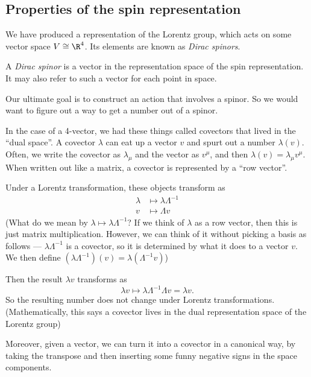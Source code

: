 \documentclass[a4paper]{article}
\begin{document}

\subsection{Properties of the spin representation}
We have produced a representation of the Lorentz group, which acts on some vector space $V \cong \R^4$. Its elements are known as \emph{Dirac spinors}.


\begin{defi}
  A \emph{Dirac spinor} is a vector in the representation space of the spin representation. It may also refer to such a vector for each point in space.
\end{defi}

Our ultimate goal is to construct an action that involves a spinor. So we would want to figure out a way to get a number out of a spinor.

In the case of a 4-vector, we had these things called covectors that lived in the ``dual space''. A covector $\lambda$ can eat up a vector $v$ and spurt out a number $\lambda(v)$. Often, we write the covector as $\lambda_\mu$ and the vector as $v^\mu$, and then $\lambda(v) = \lambda_\mu v^\mu$. When written out like a matrix, a covector is represented by a ``row vector''.

Under a Lorentz transformation, these objects transform as
\begin{align*}
  \lambda &\mapsto \lambda \Lambda^{-1}\\
  v &\mapsto \Lambda v
\end{align*}
(What do we mean by $\lambda \mapsto \lambda \Lambda^{-1}$? If we think of $\lambda$ as a row vector, then this is just matrix multiplication. However, we can think of it without picking a basis as follows --- $\lambda \Lambda^{-1}$ is a covector, so it is determined by what it does to a vector $v$. We then define $(\lambda \Lambda^{-1})(v) = \lambda(\Lambda^{-1}v)$)

Then the result $\lambda v$ transforms as
\[
  \lambda v \mapsto \lambda \Lambda^{-1} \Lambda v = \lambda v.
\]
So the resulting number does not change under Lorentz transformations. (Mathematically, this says a covector lives in the dual representation space of the Lorentz group)

Moreover, given a vector, we can turn it into a covector in a canonical way, by taking the transpose and then inserting some funny negative signs in the space components.
\end{document}
